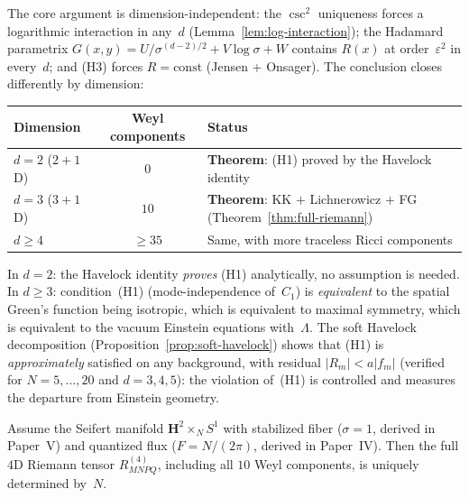 \begin{remark}
\label{rmk:higher-d}
The core argument is dimension-independent:
the $\csc^2$ uniqueness forces a logarithmic interaction
in any~$d$ (Lemma~\ref{lem:log-interaction}); the Hadamard parametrix
$G(x,y) = U/\sigma^{(d-2)/2} + V\log\sigma + W$ contains
$R(x)$ at order~$\varepsilon^2$ in every~$d$;
and (H3) forces $R = \mathrm{const}$ (Jensen + Onsager).
The conclusion closes differently by dimension:

\medskip
\begin{center}
\small
\begin{tabular}{lcl}
\toprule
Dimension & Weyl components & Status \\
\midrule
$d = 2$ ($2{+}1$D) & $0$ &
  \textbf{Theorem}: (H1) proved by the Havelock identity \\
$d = 3$ ($3{+}1$D) & $10$ &
  \textbf{Theorem}: KK $+$ Lichnerowicz $+$ FG
  (Theorem~\ref{thm:full-riemann}) \\
$d \ge 4$ & $\ge 35$ &
  Same, with more traceless Ricci components \\
\bottomrule
\end{tabular}
\end{center}
\medskip

\noindent
In $d = 2$: the Havelock identity \emph{proves} (H1)
analytically, no assumption is needed.
In $d \ge 3$: condition~(H1) (mode-independence of~$C_1$) is
\emph{equivalent} to the spatial Green's function being isotropic,
which is equivalent to maximal symmetry, which is equivalent
to the vacuum Einstein equations with~$\Lambda$.
The soft Havelock decomposition
(Proposition~\ref{prop:soft-havelock})
shows that (H1) is \emph{approximately} satisfied on any background,
with residual $|R_m| < a|f_m|$ (verified for $N = 5,\ldots,20$
and $d = 3, 4, 5$):
the violation of~(H1) is controlled and measures
the departure from Einstein geometry.
\end{remark}

\begin{derivation}
\label{thm:full-riemann}
Assume the Seifert manifold $\mathbf{H}^2 \times_N S^1$ with
stabilized fiber ($\sigma = 1$, derived in Paper~V) and
quantized flux ($F = N/(2\pi)$, derived in Paper~IV).
Then the full $4$D Riemann tensor
$R^{(4)}_{MNPQ}$, including all $10$ Weyl
components, is uniquely determined by~$N$.
\end{derivation}

